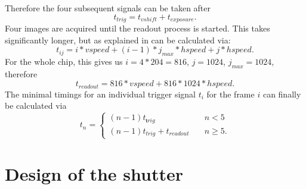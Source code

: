 Therefore the four subsequent signals can be taken after
\begin{equation}
t_{trig} = t_{vshift} + t_{exposure}.
\end{equation}
Four images are acquired until the readout process is started. This takes significantly longer, but as explained in  can be calculated via:
\begin{equation}
t_{ij} = i*vspeed + (i-1)*j_{max}*hspeed+j*hspeed.
\end{equation}
For the whole chip, this gives us $i=4*204=816$, $j=1024$, $j_{max}=1024$, therefore
\begin{equation}
t_{readout} = 816*vspeed + 816*1024*hspeed.
\end{equation}
The minimal timings for an individual trigger signal $t_i$ for the frame $i$ can finally be calculated via
$$
t_n = \left\{
\begin{array}{ll}
(n-1)t_{ŧrig} & \quad n < 5 \\
(n-1)t_{trig} + t_{readout} & \quad n \geq 5 .
\end{array}
\right.
$$

\chapter{Design of the shutter}
\label{ch:shutter_design}

